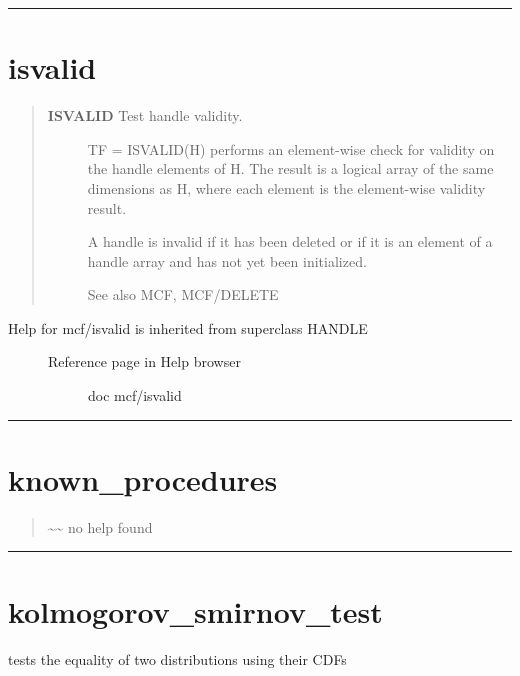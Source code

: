 \documentclass[letterpaper,10pt,english]{sphinxmanual}
\begin{document}
\bigskip\hrule{}\bigskip



\section{isvalid}
\label{classes/utils/@mcf/mcf:isvalid}\label{classes/utils/@mcf/mcf:id16}\begin{quote}
\begin{description}
\item[{\textbf{ISVALID}   Test handle validity.}] \leavevmode
TF = ISVALID(H) performs an element-wise check for validity on the
handle elements of H.  The result is a logical array of the same
dimensions as H, where each element is the element-wise validity
result.

A handle is invalid if it has been deleted or if it is an element
of a handle array and has not yet been initialized.

See also MCF, MCF/DELETE

\end{description}
\end{quote}
\begin{description}
\item[{Help for mcf/isvalid is inherited from superclass HANDLE}] \leavevmode\begin{description}
\item[{Reference page in Help browser}] \leavevmode
doc mcf/isvalid

\end{description}

\end{description}


\bigskip\hrule{}\bigskip



\section{known\_procedures}
\label{classes/utils/@mcf/mcf:known-procedures}\label{classes/utils/@mcf/mcf:id17}\begin{quote}

\textasciitilde{}\textasciitilde{} no help found
\end{quote}


\bigskip\hrule{}\bigskip



\section{kolmogorov\_smirnov\_test}
\label{classes/utils/@mcf/mcf:id18}\label{classes/utils/@mcf/mcf:kolmogorov-smirnov-test}
tests the equality of two distributions using their CDFs
\end{document}
